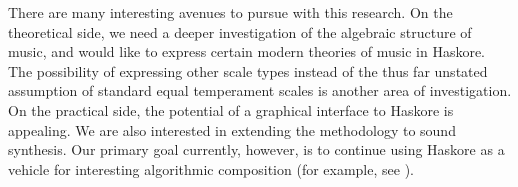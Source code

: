 There are many interesting avenues to pursue with this research.  On
the theoretical side, we need a deeper investigation of the algebraic
structure of music, and would like to express certain modern theories
of music in Haskore.  The possibility of expressing other scale types
instead of the thus far unstated assumption of standard equal
temperament scales is another area of investigation.  On the practical
side, the potential of a graphical interface to Haskore is appealing.
We are also interested in extending the methodology to sound
synthesis.  Our primary goal currently, however, is to continue using
Haskore as a vehicle for interesting algorithmic composition (for
example, see \cite{hudakberger95}).

